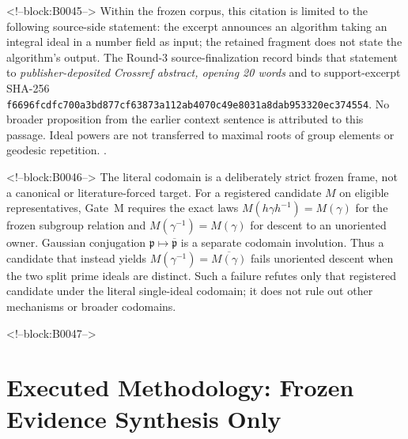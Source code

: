 \documentclass[11pt,a4paper]{article}
\begin{document}
<!--block:B0045-->
Within the frozen corpus, this citation is limited to the following source-side statement: the excerpt announces an algorithm taking an integral ideal in a number field as input; the retained fragment does not state the algorithm's output. The Round-3 source-finalization record binds that statement to \emph{publisher-deposited Crossref abstract, opening 20 words} and to support-excerpt SHA-256 \texttt{f6696fcd\allowbreak{}fc700a3b\allowbreak{}d877cf63\allowbreak{}873a112a\allowbreak{}b4070c49\allowbreak{}e8031a8d\allowbreak{}ab953320\allowbreak{}ec374554}. No broader proposition from the earlier context sentence is attributed to this passage. Ideal powers are not transferred to maximal roots of group elements or geodesic repetition.
\citep{P29-S22}.

<!--block:B0046-->
The literal codomain is a deliberately strict frozen frame, not a canonical or literature-forced target. For a registered candidate \(M\) on eligible representatives, Gate~M requires the exact laws \(M(h\gamma h^{-1})=M(\gamma)\) for the frozen subgroup relation and \(M(\gamma^{-1})=M(\gamma)\) for descent to an unoriented owner. Gaussian conjugation \(\mathfrak p\mapsto\overline{\mathfrak p}\) is a separate codomain involution. Thus a candidate that instead yields \(M(\gamma^{-1})=\overline{M(\gamma)}\) fails unoriented descent when the two split prime ideals are distinct. Such a failure refutes only that registered candidate under the literal single-ideal codomain; it does not rule out other mechanisms or broader codomains.

<!--block:B0047-->
\section{Executed Methodology: Frozen Evidence Synthesis Only}
\end{document}
